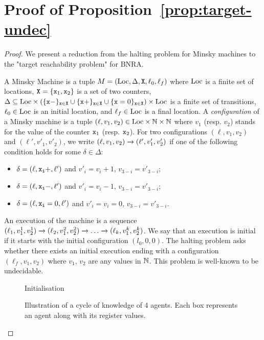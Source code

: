 \section{Proof of Proposition~\ref{prop:target-undec}}
\label{app:target}

\propTargetUndecidable*

\begin{proof}
	We present a reduction from the halting problem for Minsky machines to the "target reachability problem" for BNRA.
	
	A Minsky Machine is a tuple $M= (\text{Loc}, \Delta, \mathtt{X}, \ell_0, \ell_f)$ where $\text{Loc}$ is a finite set of locations, $\mathtt{X} = \{\mathtt{x}_1, \mathtt{x}_2\}$ is a set of two counters, $\Delta \subseteq \text{Loc} \times (\{\mathtt{\mathtt{x}}-\}_{\mathtt{x} \in \mathtt{X}} \cup \{\mathtt{\mathtt{x}}+\}_{\mathtt{x} \in \mathtt{X}} \cup \{\mathtt{\mathtt{x}}=0\}_{\mathtt{x} \in \mathtt{X}} ) \times \text{Loc}$ is a finite set of transitions, $\ell_0 \in \text{Loc}$ is an initial location, and $\ell_f \in \text{Loc}$ is a final location. A \emph{configuration} of a Minsky machine is a tuple $(\ell, v_1, v_2) \in \text{Loc} \times \mathbb{N} \times \mathbb{N}$ where $v_1$ (resp. $v_2$) stands for the value of the counter $\mathtt{x}_1$ (resp. $\mathtt{x}_2$). 
	For two configurations $(\ell, v_1, v_2)$ and  $(\ell', v'_1, v'_2)$, we write $(\ell, v_1, v_2) \xrightarrow{} (\ell', v'_1, v'_2)$ if one of the following condition holds for some $\delta \in \Delta$:
	\begin{itemize}
		\item $\delta = (\ell, \mathtt{\mathtt{x}_i}+, \ell')$ and $v'_i = v_i+1$, $v_{3-i} = v'_{3-i}$;
		\item $\delta = (\ell, \mathtt{\mathtt{x}_i}-, \ell')$ and $v'_i = v_i-1$, $v_{3-i} = v'_{3-i}$;
		\item $\delta = (\ell, \mathtt{\mathtt{x}_i}=0, \ell')$ and $v'_i = v_i = 0$, $v_{3-i} = v'_{3-i}$.
	\end{itemize}
	An execution of the machine is a sequence $(\ell_1, v_1^1, v_2^1) \xrightarrow{} (\ell_2, v_1^2, v_2^2) \xrightarrow{} \dots \xrightarrow{} (\ell_k, v_1^k, v_2^k)$. We say that an execution is initial if it starts with the initial configuration $(l_0, 0, 0)$.
	The halting problem asks whether there exists an initial execution ending with a configuration $(\ell_f, v_1, v_2)$ where $v_1$, $v_2$ are any values in $\mathbb{N}$. This problem is well-known to be undecidable.
	
	
	\begin{figure}
	
	\caption{Initialisation}\label{fig:target-init}
\end{figure}
	\begin{figure}
		
		\caption{Illustration of a cycle of knowledge of 4 agents. Each box represents an agent along with its register values.}\label{fig:target-cycle-knowledge}
	\end{figure}
	


\end{proof}
